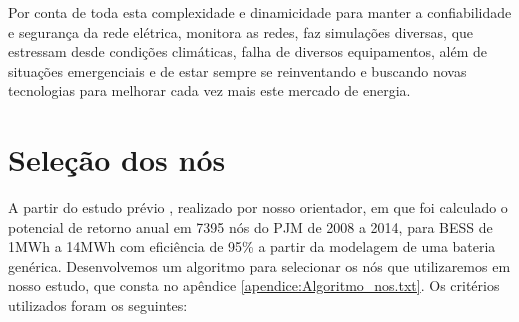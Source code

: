 Por conta de toda esta complexidade e dinamicidade para manter a confiabilidade e segurança da rede elétrica, monitora as redes, faz simulações diversas, que estressam desde condições climáticas, falha de diversos equipamentos, além de situações emergenciais e de estar sempre se reinventando e buscando novas tecnologias para melhorar cada vez mais este mercado de energia.

\section{Seleção dos nós}
A partir do estudo prévio \cite{salles2017}, realizado por nosso orientador, em que foi calculado o potencial de retorno anual em 7395 nós do PJM de 2008 a 2014, para \ac{BESS} de 1MWh a 14MWh com eficiência de 95\% a partir da modelagem de uma bateria genérica. Desenvolvemos um algoritmo para selecionar os nós que utilizaremos em nosso estudo, que consta no apêndice \ref{apendice:Algoritmo_nos.txt}.
Os critérios utilizados foram os seguintes:
